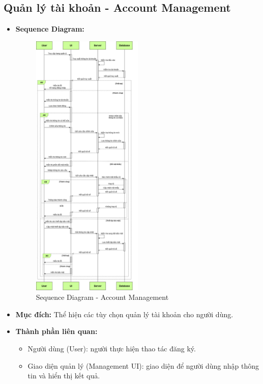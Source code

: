 \documentclass[a4paper]{article}
\begin{document}
\begin{itemize}
\end{itemize}
\subsection{Quản lý tài khoản - Account Management}
\begin{itemize}
	\item \textbf{Sequence Diagram:}
	      \begin{figure}[H]
		      \centering
		      \includegraphics[width=0.5\textwidth]{Images/account-management_sequence.png}
		      \caption{Sequence Diagram - Account Management}
	      \end{figure}
	\item \textbf{Mục đích:} Thể hiện các tùy chọn quản lý tài khoản cho người dùng.
	\item \textbf{Thành phần liên quan:}
	      \begin{itemize}
		      \item Người dùng (User): người thực hiện thao tác đăng ký.
		      \item Giao diện quản lý (Management UI): giao diện để người dùng nhập thông tin và hiển thị kết quả.

\end{itemize}
\end{itemize}
\end{document}
